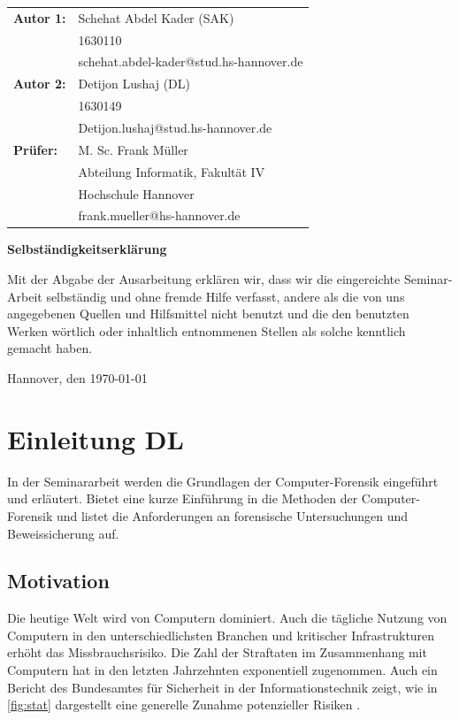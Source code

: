 \documentclass[12pt,DIV=14, version=first, BCOR=10mm,a4paper,twoside,parskip=half-,headsepline,headinclude]{scrartcl}
\begin{document}
\begin{tabular}{ll}
{\bfseries\sffamily Autor 1:}   & Schehat Abdel Kader (SAK)\\ 
                                & 1630110 \\
                                & schehat.abdel-kader@stud.hs-hannover.de \\[5ex]
{\bfseries\sffamily Autor 2:}   & Detijon Lushaj (DL)\\  
                                & 1630149 \\
                                & Detijon.lushaj@stud.hs-hannover.de \\[5ex]
 {\bfseries\sffamily Prüfer:}   & M. Sc. Frank Müller \\
          	                    & Abteilung Informatik, Fakultät IV \\
         	                    & Hochschule Hannover \\
        	                    & frank.mueller@hs-hannover.de
\end{tabular}

\vfill

\begin{center} \sffamily\bfseries Selbständigkeitserklärung \end{center}

Mit der Abgabe der Ausarbeitung erklären wir, dass wir die eingereichte Seminar-Arbeit
selbständig und ohne fremde Hilfe verfasst, andere als die von uns angegebenen Quellen
und Hilfsmittel nicht benutzt und die den benutzten Werken wörtlich oder
inhaltlich entnommenen Stellen als solche kenntlich gemacht haben. 
\vspace*{7ex}

Hannover, den \today \hfill 

\pagebreak
{}
\tableofcontents
\pagebreak

\section {Einleitung DL}
In der Seminararbeit werden die Grundlagen der Computer-Forensik eingeführt und erläutert. Bietet eine kurze Einführung in die Methoden der Computer-Forensik und listet die Anforderungen an forensische Untersuchungen und Beweissicherung auf.

	\subsection {Motivation}
	Die heutige Welt wird von Computern dominiert. Auch die tägliche Nutzung von Computern in den unterschiedlichsten Branchen und kritischer Infrastrukturen erhöht das Missbrauchsrisiko. Die Zahl der Straftaten im Zusammenhang mit Computern hat in den letzten Jahrzehnten exponentiell zugenommen. Auch ein Bericht des Bundesamtes für Sicherheit in der Informationstechnik zeigt, wie in \autoref{fig:stat} dargestellt eine generelle Zunahme potenzieller Risiken \cite[vgl. S. 11]{BSI_lagebericht}.
	
\end{document}
